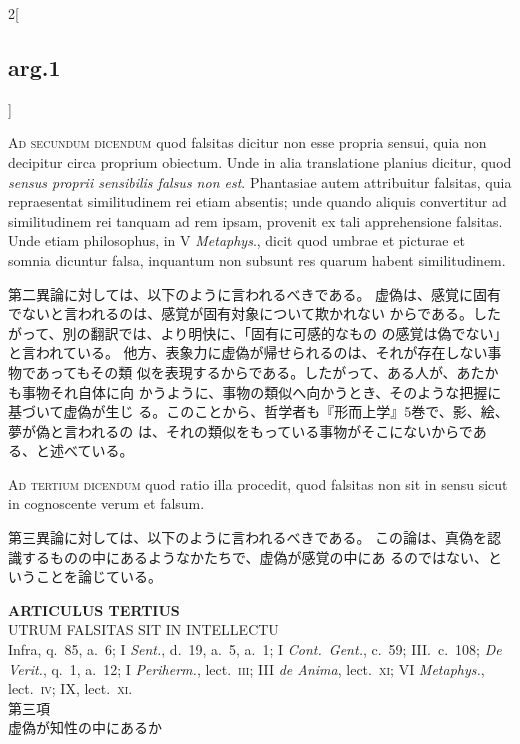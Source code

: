 \documentclass[paper=a4paper,fontsize=10pt,jafontsize=9pt,titlepage]{jlreq}
\begin{document}
\begin{paracol}{2}[\subsection{arg.1}]
\switchcolumn*[\subsection{ad.2}]


{\scshape Ad secundum dicendum} quod falsitas dicitur non esse propria
sensui, quia non decipitur circa proprium obiectum. Unde in alia
translatione planius dicitur, quod {\itshape sensus proprii sensibilis falsus non
est}. Phantasiae autem attribuitur falsitas, quia repraesentat
similitudinem rei etiam absentis; unde quando aliquis convertitur ad
similitudinem rei tanquam ad rem ipsam, provenit ex tali apprehensione
falsitas. Unde etiam philosophus, in V {\itshape Metaphys}., dicit quod umbrae et
picturae et somnia dicuntur falsa, inquantum non subsunt res quarum
habent similitudinem.

\switchcolumn

第二異論に対しては、以下のように言われるべきである。
虚偽は、感覚に固有でないと言われるのは、感覚が固有対象について欺かれない
 からである。したがって、別の翻訳では、より明快に、「固有に可感的なもの
 の感覚は偽でない」と言われている。
他方、表象力に虚偽が帰せられるのは、それが存在しない事物であってもその類
 似を表現するからである。したがって、ある人が、あたかも事物それ自体に向
 かうように、事物の類似へ向かうとき、そのような把握に基づいて虚偽が生じ
 る。このことから、哲学者も『形而上学』5巻で、影、絵、夢が偽と言われるの
 は、それの類似をもっている事物がそこにないからである、と述べている。

\switchcolumn*[\subsection{ad.3}]


{\scshape Ad tertium dicendum} quod ratio illa procedit, quod falsitas
non sit in sensu sicut in cognoscente verum et falsum.

\switchcolumn

第三異論に対しては、以下のように言われるべきである。
この論は、真偽を認識するものの中にあるようなかたちで、虚偽が感覚の中にあ
 るのではない、ということを論じている。

\end{paracol}
\newpage



{}
\setcounter{section}{3}
\setcounter{subsection}{0}
\begin{center}
 {\Large {\bfseries ARTICULUS TERTIUS}}\\
 {\large UTRUM FALSITAS SIT IN INTELLECTU}\\
 {\footnotesize Infra, q.~85, a.~6; I {\itshape Sent.}, d.~19, a.~5,
 a.~1; I {\itshape Cont.~Gent.}, c.~59; III.~c.~108; {\itshape De
 Verit.}, q.~1, a.~12; I {\itshape Periherm.}, lect.~{\scshape iii}; III
 {\itshape de Anima}, lect.~{\scshape xi}; VI {\itshape Metaphys.},
 lect.~{\scshape iv}; IX, lect.~{\scshape xi}.}\\
 {\Large 第三項\\虚偽が知性の中にあるか}
\end{center}
\end{document}
